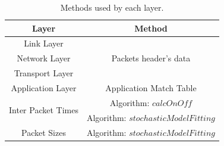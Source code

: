 \begin{table}[ht!]
    \centering
    \caption{Methods used by each layer.}
    \label{tab:methods}
    \begin{tabular}{cc}
        \hline
        Layer                               & Method                                 \\ \hline
        Link Layer                          & \multirow{3}{*}{Packets header's data} \\
        Network Layer                       &                                        \\
        Transport Layer                     &                                        \\
        Application Layer                   & Application Match Table                \\
        \multirow{2}{*}{Inter Packet Times} & Algorithm: $calcOnOff$                 \\
        & Algorithm: $stochasticModelFitting$    \\
        Packet Sizes                        & Algorithm: $stochasticModelFitting$    \\ \hline
    \end{tabular}
\end{table}







